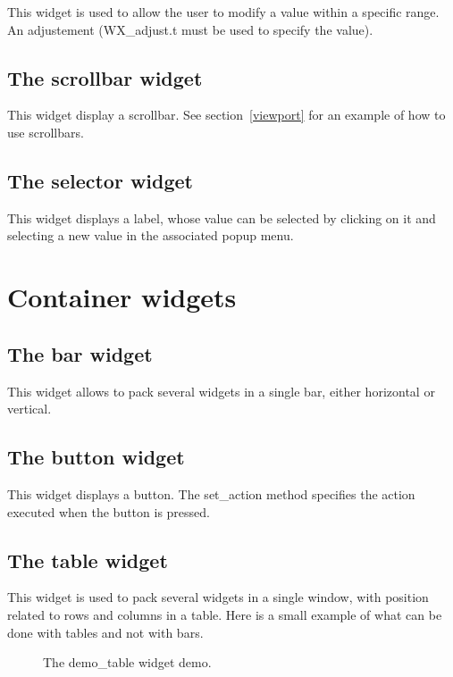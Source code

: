 \documentclass{report}
\newcommand{\psfigure}[3]{ %
  \begin{quote}\let\normalsize\small\caption{#3\label{fig:#2}}\end{quote}
  }
\begin{document}
This widget is used to allow the user to modify a value within a specific 
range. An adjustement ({\sf WX\_adjust.t} must be used to specify the 
value). 

\subsection{The {\sf scrollbar} widget}

This widget display a scrollbar. See section~\ref{viewport} for an example 
of how to use scrollbars.

\subsection{The {\sf selector} widget}

 This widget displays a label, whose value can be selected by clicking on 
it and selecting a new value in the associated popup menu.

\section{Container widgets}

\subsection{The {\sf bar} widget}

 This widget allows to pack several widgets in a single bar, either
horizontal or vertical.

\subsection{The {\sf button} widget}

 This widget displays a button. The {\sf set\_action} method specifies the 
action executed when the button is pressed.

\subsection{The {\sf table} widget}
\label{table}

 This widget is used to pack several widgets in a single window, with 
position related to rows and columns in a table. Here is a small example 
of what can be done with tables and not with bars.

\begin{figure}[t]
\begin{center}
\psfigure{1}{table}{The demo\_table widget demo.}
\end{center}
\end{figure}
\end{document}
